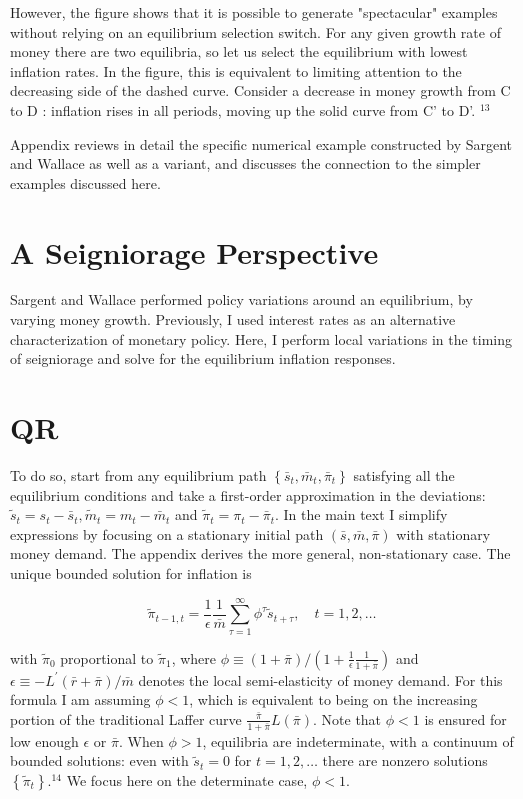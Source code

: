 \documentclass[10pt]{article}
\begin{document}
However, the figure shows that it is possible to generate "spectacular" examples without relying on an equilibrium selection switch. For any given growth rate of money there are two equilibria, so let us select the equilibrium with lowest inflation rates. In the figure, this is equivalent to limiting attention to the decreasing side of the dashed curve. Consider a decrease in money growth from C to D : inflation rises in all periods, moving up the solid curve from C' to D'. ${ }^{13}$

Appendix reviews in detail the specific numerical example constructed by Sargent and Wallace as well as a variant, and discusses the connection to the simpler examples discussed here.

\section*{A Seigniorage Perspective}
Sargent and Wallace performed policy variations around an equilibrium, by varying money growth. Previously, I used interest rates as an alternative characterization of monetary policy. Here, I perform local variations in the timing of seigniorage and solve for the equilibrium inflation responses.

\section*{QR}
To do so, start from any equilibrium path $\left\{\bar{s}_{t}, \bar{m}_{t}, \bar{\pi}_{t}\right\}$ satisfying all the equilibrium conditions and take a first-order approximation in the deviations: $\tilde{s}_{t}=s_{t}-\bar{s}_{t}, \tilde{m}_{t}=m_{t}-\bar{m}_{t}$ and $\tilde{\pi}_{t}=\pi_{t}-\bar{\pi}_{t}$. In the main text I simplify expressions by focusing on a stationary initial path $(\bar{s}, \bar{m}, \bar{\pi})$ with stationary money demand. The appendix derives the more general, non-stationary case. The unique bounded solution for inflation is

\begin{equation*}
\tilde{\pi}_{t-1, t}=\frac{1}{\epsilon} \frac{1}{\bar{m}} \sum_{\tau=1}^{\infty} \phi^{\tau} \tilde{s}_{t+\tau}, \quad t=1,2, \ldots \tag{3}
\end{equation*}

with $\tilde{\pi}_{0}$ proportional to $\tilde{\pi}_{1}$, where $\phi \equiv(1+\bar{\pi}) /\left(1+\frac{1}{\epsilon} \frac{1}{1+\bar{\pi}}\right)$ and $\epsilon \equiv-L^{\prime}(\bar{r}+\bar{\pi}) / \bar{m}$ denotes the local semi-elasticity of money demand. For this formula I am assuming $\phi<1$, which is equivalent to being on the increasing portion of the traditional Laffer curve $\frac{\bar{\pi}}{1+\bar{\pi}} L(\bar{\pi})$. Note that $\phi<1$ is ensured for low enough $\epsilon$ or $\bar{\pi}$. When $\phi>1$, equilibria are indeterminate, with a continuum of bounded solutions: even with $\tilde{s}_{t}=0$ for $t=1,2, \ldots$ there are nonzero solutions $\left\{\tilde{\pi}_{t}\right\} .{ }^{14}$ We focus here on the determinate case, $\phi<1$.
\end{document}
